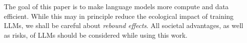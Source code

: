 The goal of this paper is to make language models more compute and data efficient. While this may in principle reduce the ecological impact of training LLMs, we shall be careful about \emph{rebound effects}.
All societal advantages, as well as risks, of LLMs should be considered while using this work.
